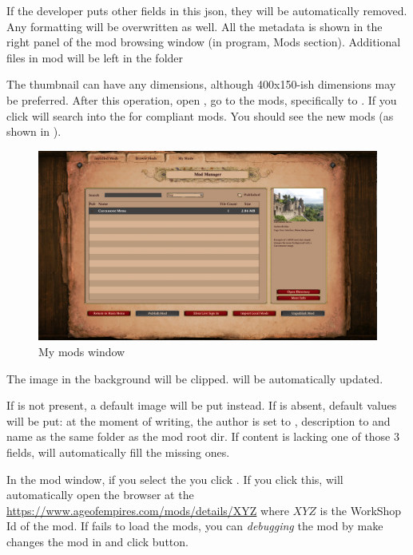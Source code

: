 If the developer puts other fields in this json, they will be automatically removed. Any formatting will be overwritten as well.
All the metadata is shown in the right panel of the mod browsing window (in \aoe{} program, Mods section). Additional files in \aoehomelocaldir{} mod will be left in the folder



The thumbnail can have any dimensions, although 400x150-ish dimensions may be preferred.
After this operation, open \aoe{}, go to the mods, specifically to . If you click  \aoe{} will search into the \aoehomelocaldir{} for compliant mods. You should see the new mods (as shown in ).

\begin{figure}[ht]
    \centering
    \includegraphics[width=1.0\textwidth]{src/images/mymods}
    \caption{My mods window}
    \label{fig:mymods}
\end{figure}

The image in the background will be clipped.  will be automatically updated.

\begin{warning}
    If  is not present, a default image will be put instead. If  is absent, default values will be put: at the moment of writing, the author is set to , description to  and name as the same folder as the mod root dir. If  content is lacking one of those 3 fields, \aoe{} will automatically fill the missing ones.
\end{warning}

In the mod window, if you select the  you click . If you click this, \aoe{} will automatically open the browser at the  \url{https://www.ageofempires.com/mods/details/XYZ} where $XYZ$ is the WorkShop Id of the mod. If \aoe{} fails to load the mods, you can \textit{debugging} the mod by make changes the mod in \aoehomelocaldir{} and click  button.
